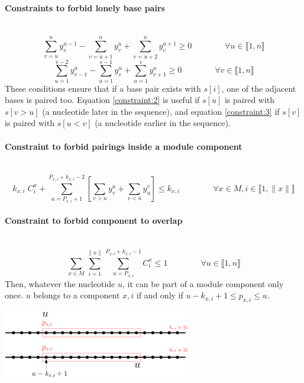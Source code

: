 \documentclass{article}
\begin{document}
\paragraph{Constraints to forbid lonely base pairs} ~
\begin{equation} \label{constraint:2}
	\sum_{v=u}^n y^{u-1}_v - \sum_{v=u+1}^n y^u_v + \sum_{v=u+2}^n y^{u+1}_v \geq 0 \qquad \qquad \forall u \in \llbracket 1,n\rrbracket
\end{equation}
\begin{equation} \label{constraint:3}
	\sum_{u=1}^{v-2} y^u_{v-1} - \sum_{u=1}^{v-1} y^u_v + \sum_{u=1}^{v} y^u_{v+1} \geq 0 \qquad \qquad \forall v \in \llbracket 1,n\rrbracket
\end{equation}
These conditions ensure that if a base pair exists with $s[i]$, 
one of the adjacent bases is paired too. 
Equation \ref{constraint:2} is useful if $s[u]$ is paired with $s[v>u]$ (a nucleotide later in the sequence), 
and equation \ref{constraint:3} if $s[v]$ is paired with $s[u<v]$ (a nucleotide earlier in the sequence).
	
\paragraph{Constraint to forbid pairings inside a module component} ~ 
\begin{equation} \label{constraint:4}
	k_{x,i} \; C^x_i + \sum_{u=P_{x,i}+1}^{P_{x,i}+k_{x,i}-2}\left[ \sum_{v>u} y^u_v + \sum_{v<u} y^v_u \right] \leq k_{x,i} 
	\qquad \qquad \forall x \in M, i \in \llbracket 1,\|x\| \rrbracket
\end{equation}
	
\paragraph{Constraint to forbid component to overlap} ~
\begin{equation} \label{constraint:5}
	\sum_{x \in M} \sum_{i=1}^{\|x\|}\sum_{u=P_{x,i}}^{P_{x,i}+k_{x,i}-1} C^x_i \leq 1 \qquad \qquad \forall u \in \llbracket 1,n \rrbracket
\end{equation}
Then, whatever the nucleotide $u$, it can be part of a module component only once. 
$u$ belongs to a component $x,i$ if and only if $u-k_{x,i}+1 \leq p_{x,i} \leq u$.\\
\begin{center}\includegraphics[height=3cm]{component.png}\end{center}
	
\end{document}
